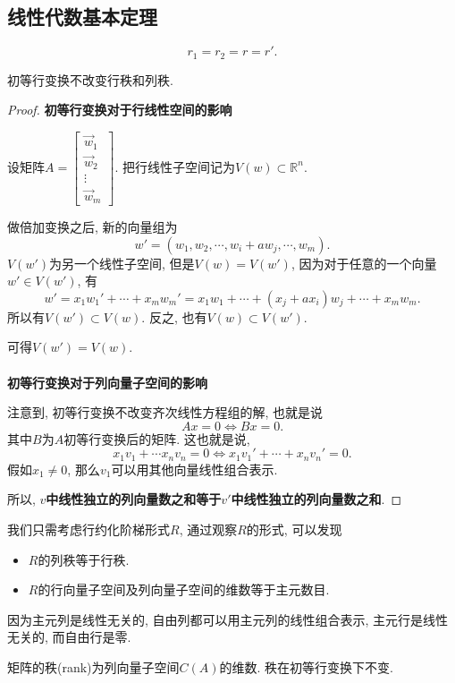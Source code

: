 \subsection{线性代数基本定理}
\begin{theorem}
    \begin{equation}
      r_1=r_2=r=r'.
    \end{equation}
\end{theorem}
\begin{proposition}
    初等行变换不改变行秩和列秩.
\end{proposition}
\begin{proof}
 
    \textbf{初等行变换对于行线性空间的影响}

    设矩阵$A = \begin{bmatrix} 
    \vec{w}_1 \\ 
    \vec{w}_2 \\ 
    \vdots \\ 
    \vec{w}_m 
    \end{bmatrix}$.
    把行线性子空间记为$V(w) \subset \mathbb{R}^{n}$.

    \vspace{.5em}
    做倍加变换之后, 新的向量组为
    \begin{equation}
      w' = (w_1,w_2,\cdots,w_i+a w_j ,\cdots,w_m).
    \end{equation}
    $V(w')$为另一个线性子空间, 但是$V(w)=V(w')$, 因为对于任意的一个向量$w' \in V(w')$, 有
    \begin{equation}
      w'=x_1w_1'+ \cdots +x_m w_m' = x_1 w_1 + \cdots +(x_j+ ax_i)w_j+ \cdots +x_m w_m.
    \end{equation}
    所以有$V(w') \subset V(w)$. 反之, 也有$V(w) \subset V(w')$.

    可得$V(w')=V(w)$.
    \\ \\
    \textbf{初等行变换对于列向量子空间的影响}

    注意到, 初等行变换不改变齐次线性方程组的解, 也就是说
    \begin{equation}
      Ax=0 \iff Bx=0.
    \end{equation}
    其中$B$为$A$初等行变换后的矩阵. 这也就是说, 
    \begin{equation}
      x_1v_1+ \cdots x_n v_n=0 \iff x_1 v_1' + \cdots +x_n v_n ' = 0.
    \end{equation}
    假如$x_1\neq 0$, 那么$v_1$可以用其他向量线性组合表示.

    所以, \textbf{$v$中线性独立的列向量数之和等于$v'$中线性独立的列向量数之和}.

\end{proof}

我们只需考虑行约化阶梯形式$R$, 通过观察$R$的形式, 可以发现
\begin{itemize}
    \item $R$的列秩等于行秩.
    
    \item $R$的行向量子空间及列向量子空间的维数等于主元数目.
\end{itemize}
因为主元列是线性无关的, 自由列都可以用主元列的线性组合表示, 主元行是线性无关的, 而自由行是零. 

\begin{definition}
  矩阵的秩(rank)为列向量子空间$C(A)$的维数. 秩在初等行变换下不变.
\end{definition}